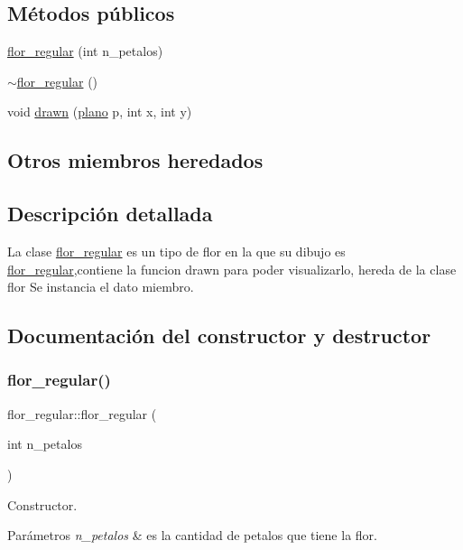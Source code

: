 \subsection*{Métodos públicos}
\begin{DoxyCompactItemize}
\item 
\hyperlink{classflor__regular_a299d17f2fed7eaae9db8f6a9533cff70}{flor\+\_\+regular} (int n\+\_\+petalos)
\item 
\hyperlink{classflor__regular_ae525b7823bdd11ad29908de8325af0eb}{$\sim$flor\+\_\+regular} ()
\item 
void \hyperlink{classflor__regular_a5805895cf36946a69173b64aaf504c58}{drawn} (\hyperlink{classplano}{plano} p, int x, int y)
\end{DoxyCompactItemize}
\subsection*{Otros miembros heredados}


\subsection{Descripción detallada}
La clase \hyperlink{classflor__regular}{flor\+\_\+regular} es un tipo de flor en la que su dibujo es \hyperlink{classflor__regular}{flor\+\_\+regular},contiene la funcion drawn para poder visualizarlo, hereda de la clase flor  Se instancia el dato miembro. 

\subsection{Documentación del constructor y destructor}
\mbox{\label{classflor__regular_a299d17f2fed7eaae9db8f6a9533cff70}} 
\subsubsection{\texorpdfstring{flor\+\_\+regular()}{flor\_regular()}}
{\footnotesize\ttfamily flor\+\_\+regular\+::flor\+\_\+regular (\begin{DoxyParamCaption}\item[{int}]{n\+\_\+petalos }\end{DoxyParamCaption})}

Constructor. 
\begin{DoxyParams}{Parámetros}
{\em n\+\_\+petalos} & es la cantidad de petalos que tiene la flor. \\
\hline
\end{DoxyParams}
\mbox{\label{classflor__regular_ae525b7823bdd11ad29908de8325af0eb}} 
